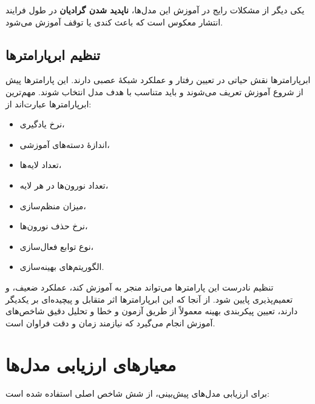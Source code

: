 یکی دیگر از مشکلات رایج در آموزش این مدل‌ها، \textbf{ناپدید شدن گرادیان} در طول فرایند انتشار معکوس است که باعث کندی یا توقف آموزش می‌شود.

\subsection*{تنظیم ابرپارامترها}

ابرپارامترها نقش حیاتی در تعیین رفتار و عملکرد شبکهٔ عصبی دارند. این پارامترها پیش از شروع آموزش تعریف می‌شوند و باید متناسب با هدف مدل انتخاب شوند. مهم‌ترین ابرپارامترها عبارت‌اند از:

\begin{itemize}
	\item نرخ یادگیری،
	\item اندازهٔ دسته‌های آموزشی،
	\item تعداد لایه‌ها،
	\item تعداد نورون‌ها در هر لایه،
	\item میزان منظم‌سازی،
	\item نرخ حذف نورون‌ها،
	\item نوع توابع فعال‌سازی،
	\item الگوریتم‌های بهینه‌سازی.
\end{itemize}

تنظیم نادرست این پارامترها می‌تواند منجر به آموزش کند، عملکرد ضعیف، و تعمیم‌پذیری پایین شود. از آنجا که این ابرپارامترها اثر متقابل و پیچیده‌ای بر یکدیگر دارند، تعیین پیکربندی بهینه معمولاً از طریق آزمون و خطا و تحلیل دقیق شاخص‌های آموزش انجام می‌گیرد که نیازمند زمان و دقت فراوان است.





\section{معیارهای ارزیابی مدل‌ها}

برای ارزیابی مدل‌های پیش‌بینی، از شش شاخص اصلی استفاده شده است:

